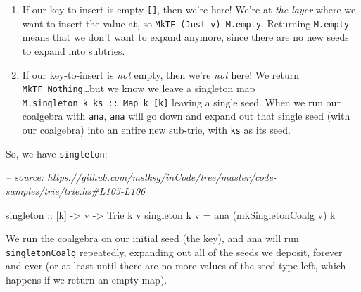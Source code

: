 \documentclass[]{article}
\newenvironment{Shaded}{}{}
\newcommand{\CharTok}[1]{\textcolor[rgb]{0.25,0.44,0.63}{#1}}
\newcommand{\CommentTok}[1]{\textcolor[rgb]{0.38,0.63,0.69}{\textit{#1}}}
\newcommand{\DataTypeTok}[1]{\textcolor[rgb]{0.56,0.13,0.00}{#1}}
\newcommand{\DecValTok}[1]{\textcolor[rgb]{0.25,0.63,0.44}{#1}}
\newcommand{\FunctionTok}[1]{\textcolor[rgb]{0.02,0.16,0.49}{#1}}
\newcommand{\NormalTok}[1]{#1}
\newcommand{\OtherTok}[1]{\textcolor[rgb]{0.00,0.44,0.13}{#1}}
\newcommand{\StringTok}[1]{\textcolor[rgb]{0.25,0.44,0.63}{#1}}
\begin{document}
\begin{enumerate}
\def\labelenumi{\arabic{enumi}.}
\item
  If our key-to-insert is empty \texttt{{[}{]}}, then we're here! We're at
  \emph{the layer} where we want to insert the value at, so
  \texttt{MkTF\ (Just\ v)\ M.empty}. Returning \texttt{M.empty} means that we
  don't want to expand anymore, since there are no new seeds to expand into
  subtries.
\item
  If our key-to-insert is \emph{not} empty, then we're \emph{not} here! We
  return \texttt{MkTF\ Nothing}\ldots{}but we know we leave a singleton map
  \texttt{M.singleton\ k\ ks\ ::\ Map\ k\ {[}k{]}} leaving a single seed. When
  we run our coalgebra with \texttt{ana}, \texttt{ana} will go down and expand
  out that single seed (with our coalgebra) into an entire new sub-trie, with
  \texttt{ks} as its seed.
\end{enumerate}

So, we have \texttt{singleton}:

\begin{Shaded}
\begin{Highlighting}[]
\CommentTok{-- source: https://github.com/mstksg/inCode/tree/master/code-samples/trie/trie.hs#L105-L106}

\OtherTok{singleton ::}\NormalTok{ [k] }\OtherTok{->}\NormalTok{ v }\OtherTok{->} \DataTypeTok{Trie}\NormalTok{ k v}
\NormalTok{singleton k v }\FunctionTok{=}\NormalTok{ ana (mkSingletonCoalg v) k}
\end{Highlighting}
\end{Shaded}

We run the coalgebra on our initial seed (the key), and ana will run
\texttt{singletonCoalg} repeatedly, expanding out all of the seeds we deposit,
forever and ever (or at least until there are no more values of the seed type
left, which happens if we return an empty map).

\begin{Shaded}
\end{Shaded}
\end{document}
